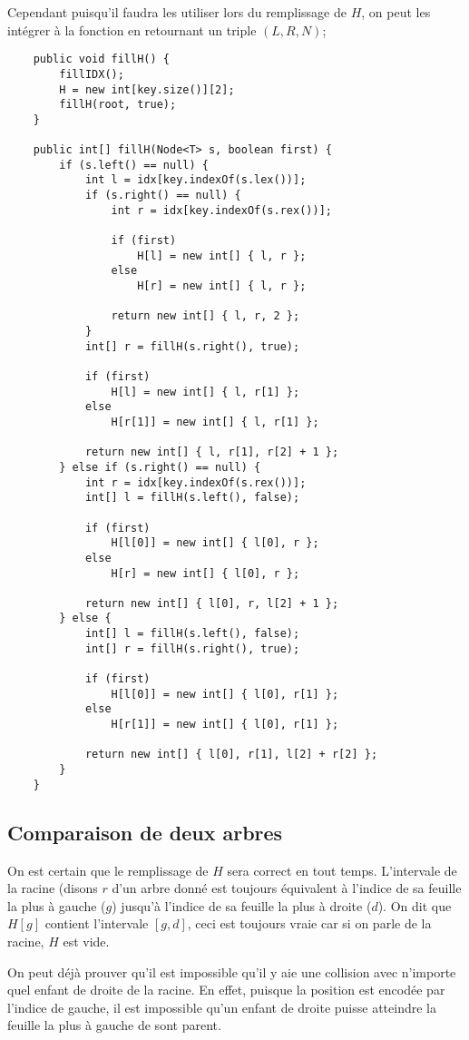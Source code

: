 \documentclass{article}
\begin{document}
Cependant puisqu'il faudra les utiliser lors du remplissage de $H$, on peut les intégrer à la fonction en retournant un triple $(L, R, N)$;
\begin{lstlisting}
	public void fillH() {
		fillIDX();
		H = new int[key.size()][2];
		fillH(root, true);
	}
        
	public int[] fillH(Node<T> s, boolean first) {
		if (s.left() == null) {
			int l = idx[key.indexOf(s.lex())];
			if (s.right() == null) {
				int r = idx[key.indexOf(s.rex())];

				if (first)
					H[l] = new int[] { l, r };
				else
					H[r] = new int[] { l, r };

				return new int[] { l, r, 2 };
			}
			int[] r = fillH(s.right(), true);

			if (first)
				H[l] = new int[] { l, r[1] };
			else
				H[r[1]] = new int[] { l, r[1] };

			return new int[] { l, r[1], r[2] + 1 };
		} else if (s.right() == null) {
			int r = idx[key.indexOf(s.rex())];
			int[] l = fillH(s.left(), false);

			if (first)
				H[l[0]] = new int[] { l[0], r };
			else
				H[r] = new int[] { l[0], r };

			return new int[] { l[0], r, l[2] + 1 };
		} else {
			int[] l = fillH(s.left(), false);
			int[] r = fillH(s.right(), true);

			if (first)
				H[l[0]] = new int[] { l[0], r[1] };
			else
				H[r[1]] = new int[] { l[0], r[1] };

			return new int[] { l[0], r[1], l[2] + r[2] };
		}
	}
\end{lstlisting}

\subsection{Comparaison de deux arbres}
On est certain que le remplissage de $H$ sera correct en tout temps. L'intervale de la racine (disons $r$ d'un arbre donné est toujours équivalent à l'indice de sa feuille la plus à gauche ($g$) jusqu'à l'indice de sa feuille la plus à droite ($d$). On dit que $H[g]$ contient l'intervale $[g, d]$, ceci est toujours vraie car si on parle de la racine, $H$ est vide.

On peut déjà prouver qu'il est impossible qu'il y aie une collision avec n'importe quel enfant de droite de la racine. En effet, puisque la position est encodée par l'indice de gauche, il est impossible qu'un enfant de droite puisse atteindre la feuille la plus à gauche de sont parent.
\end{document}
